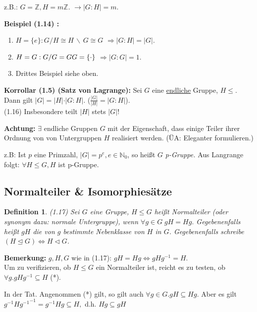 \documentclass[10pt,a4paper]{article}
\newtheorem{defi}{Definition}
\begin{document}
z.B.: $G = \mathbb{Z}, H = m \mathbb{Z}$. $\rightarrow \vert G : H\vert
 = m$.
 
\textbf{Beispiel (1.14) :} \begin{enumerate}
\item $H = \{ e \}: G/H \cong H \,\backslash\, G \cong G$ %
$\Rightarrow \vert G : H\vert = \vert G \vert$.
\item $H = G: G/G = G\\G = \{\cdot\}$ %
$\Rightarrow \vert G : G\vert = 1$.
\item Drittes Beispiel siehe oben.
\end{enumerate}

\textbf{Korrollar (1.5) (Satz von Lagrange):} Sei $G$ eine \underline{endliche} Gruppe, $H \leqslant$. Dann gilt $\vert G\vert = \vert H \vert \cdot \vert G : H \vert$. ($\frac{\vert G\vert}{\vert H \vert} = \vert G : H \vert$).\\ (1.16) Insbesondere teilt $\vert H \vert$ stets $\vert G\vert$!

\textbf{Achtung:} $\exists$ endliche Gruppen $G$ mit der Eigenschaft, dass einige Teiler ihrer Ordnung von von Untergruppen $H$ realisiert werden. (ÜA: Eleganter formulieren.)

z.B: Ist $p$ eine Primzahl, $\vert G\vert = p^e, e \in \mathbb{N}_0$, so heißt $G$ \emph{p-Gruppe.} Aus Langrange folgt: $\forall H \leqslant G, H$ ist p-Gruppe.

\subsection{Normalteiler \& Isomorphiesätze}

\begin{defi}(1.17)
Sei $G$ eine Gruppe, $H \leqslant G$ heißt \emph{Normalteiler} (oder synonym dazu: normale Untergruppe), wenn $\forall g \in G\; gH = Hg.$
Gegebenenfalls heißt $gH$ die von $g$ bestimmte Nebenklasse von $H$ in $G$. Gegebenenfalls schreibe $(H \trianglelefteq G) \Leftrightarrow H \triangleleft G$.
\end{defi}

\textbf{Bemerkung:} $g, H, G$ wie in (1.17): $gH = Hg \Leftrightarrow g H g^{-1} = H$.\\
Um zu verifizieren, ob $H \leqslant G$ ein Normalteiler ist, reicht es zu testen, ob $\forall g. g H g^{-1} \subseteq H$ (*).

In der Tat. Angenommen (*) gilt, so gilt auch $\forall g \in G. gH \subseteq Hg$. Aber es gilt $g^{-1}H{g^{-1}}^{-1} = g^{-1}Hg \subseteq H, $ d.h. $Hg \subseteq gH$
\end{document}
